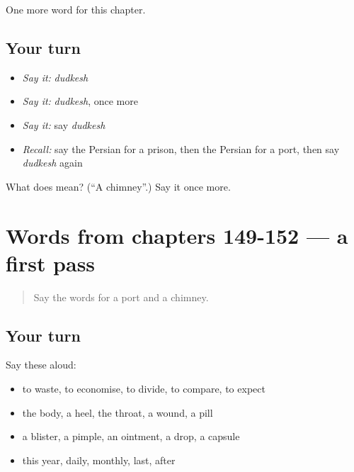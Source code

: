 \begin{grammarlens}[title={What you've built}]
One more word for this chapter.
\end{grammarlens}

\subsection*{Your turn}
\begin{itemize}
\raggedright
  \item \emph{Say it:} \emph{dudkesh}
  \item \emph{Say it:} \emph{dudkesh}, once more
  \item \emph{Say it:} say \emph{dudkesh}
  \item \emph{Recall:} say the Persian for a prison, then the Persian for a port, then say \emph{dudkesh} again
\end{itemize}

\begin{tcolorbox}[breakable,colback=teal!4,colframe=teal!35!black,title={Before you move on}]
What does  mean? (\textquotedblleft{}A chimney\textquotedblright{}.) Say it once more.
\end{tcolorbox}
\section[(dialogue)]{Words from chapters 149-152 — a first pass}

\label{lesson:FA-R157-first-pass-words-from-chapters-149-152}



\begin{quote}
Say the words for a port and a chimney.
\end{quote}

\subsection*{Your turn}
Say these aloud:

\begin{itemize}
\raggedright
  \item to waste, to economise, to divide, to compare, to expect
  \item the body, a heel, the throat, a wound, a pill
  \item a blister, a pimple, an ointment, a drop, a capsule
  \item this year, daily, monthly, last, after
\end{itemize}

